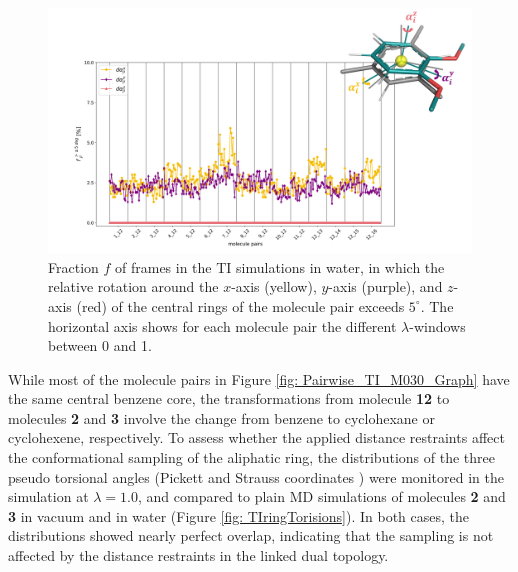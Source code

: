 \begin{figure}[h!]
    \centering
    \includegraphics[width=\textwidth]{fig/results/pairwise/sampling/TI_pairwise_molecule_rotation.png}
    \caption{Fraction $f$ of frames in the TI simulations in water, in which the relative rotation around the $x$-axis (yellow), $y$-axis (purple), and $z$-axis (red) of the central rings of the molecule pair exceeds $5^{\circ}$. The horizontal axis shows for each molecule pair the different $\lambda$-windows between 0 and 1.}
    \label{fig: pairMolRotation_TIStarMap}
\end{figure}

While most of the molecule pairs in Figure \ref{fig: Pairwise_TI_M030_Graph} have the same central benzene core, the transformations from molecule \textbf{12} to molecules \textbf{2} and \textbf{3} involve the change from benzene to cyclohexane or cyclohexene, respectively. To assess whether the applied distance restraints affect the conformational sampling of the aliphatic ring, the distributions of the three pseudo torsional angles (Pickett and Strauss coordinates \cite{Strauss1970}) were monitored in the simulation at $\lambda=1.0$, and compared to plain MD simulations of molecules \textbf{2} and \textbf{3} in vacuum and in water (Figure \ref{fig: TIringTorisions}).
In both cases, the distributions showed nearly perfect overlap, indicating that the sampling is not affected by the distance restraints in the linked dual topology.

